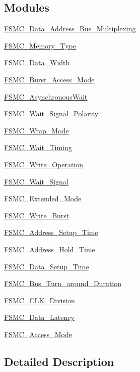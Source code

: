 \subsection*{Modules}
\begin{DoxyCompactItemize}
\item 
\hyperlink{group___f_s_m_c___data___address___bus___multiplexing}{F\+S\+M\+C\+\_\+\+Data\+\_\+\+Address\+\_\+\+Bus\+\_\+\+Multiplexing}
\item 
\hyperlink{group___f_s_m_c___memory___type}{F\+S\+M\+C\+\_\+\+Memory\+\_\+\+Type}
\item 
\hyperlink{group___f_s_m_c___data___width}{F\+S\+M\+C\+\_\+\+Data\+\_\+\+Width}
\item 
\hyperlink{group___f_s_m_c___burst___access___mode}{F\+S\+M\+C\+\_\+\+Burst\+\_\+\+Access\+\_\+\+Mode}
\item 
\hyperlink{group___f_s_m_c___asynchronous_wait}{F\+S\+M\+C\+\_\+\+Asynchronous\+Wait}
\item 
\hyperlink{group___f_s_m_c___wait___signal___polarity}{F\+S\+M\+C\+\_\+\+Wait\+\_\+\+Signal\+\_\+\+Polarity}
\item 
\hyperlink{group___f_s_m_c___wrap___mode}{F\+S\+M\+C\+\_\+\+Wrap\+\_\+\+Mode}
\item 
\hyperlink{group___f_s_m_c___wait___timing}{F\+S\+M\+C\+\_\+\+Wait\+\_\+\+Timing}
\item 
\hyperlink{group___f_s_m_c___write___operation}{F\+S\+M\+C\+\_\+\+Write\+\_\+\+Operation}
\item 
\hyperlink{group___f_s_m_c___wait___signal}{F\+S\+M\+C\+\_\+\+Wait\+\_\+\+Signal}
\item 
\hyperlink{group___f_s_m_c___extended___mode}{F\+S\+M\+C\+\_\+\+Extended\+\_\+\+Mode}
\item 
\hyperlink{group___f_s_m_c___write___burst}{F\+S\+M\+C\+\_\+\+Write\+\_\+\+Burst}
\item 
\hyperlink{group___f_s_m_c___address___setup___time}{F\+S\+M\+C\+\_\+\+Address\+\_\+\+Setup\+\_\+\+Time}
\item 
\hyperlink{group___f_s_m_c___address___hold___time}{F\+S\+M\+C\+\_\+\+Address\+\_\+\+Hold\+\_\+\+Time}
\item 
\hyperlink{group___f_s_m_c___data___setup___time}{F\+S\+M\+C\+\_\+\+Data\+\_\+\+Setup\+\_\+\+Time}
\item 
\hyperlink{group___f_s_m_c___bus___turn__around___duration}{F\+S\+M\+C\+\_\+\+Bus\+\_\+\+Turn\+\_\+around\+\_\+\+Duration}
\item 
\hyperlink{group___f_s_m_c___c_l_k___division}{F\+S\+M\+C\+\_\+\+C\+L\+K\+\_\+\+Division}
\item 
\hyperlink{group___f_s_m_c___data___latency}{F\+S\+M\+C\+\_\+\+Data\+\_\+\+Latency}
\item 
\hyperlink{group___f_s_m_c___access___mode}{F\+S\+M\+C\+\_\+\+Access\+\_\+\+Mode}
\end{DoxyCompactItemize}


\subsection{Detailed Description}
